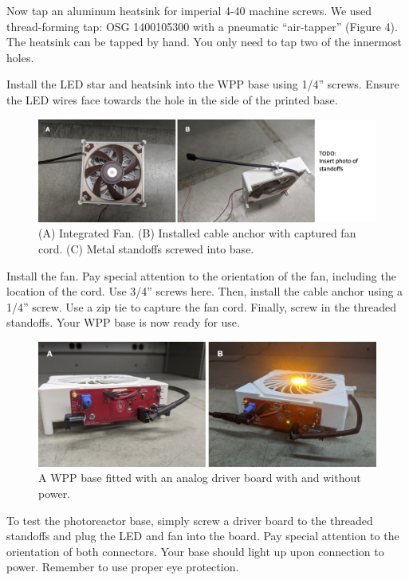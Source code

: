 \documentclass[11pt]{article}
\begin{document}
Now tap an aluminum heatsink for imperial 4-40 machine screws.
We used thread-forming tap: OSG 1400105300 with a pneumatic ``air-tapper'' (Figure 4).
The heatsink can be tapped by hand.
You only need to tap two of the innermost holes.

Install the LED star and heatsink into the WPP base using 1/4'' screws.
Ensure the LED wires face towards the hole in the side of the printed base.  

\begin{figure}[H]
	\includegraphics[width=\textwidth]{"./fig6.png"}
	\caption{(A) Integrated Fan. (B) Installed cable anchor with captured fan cord. (C) Metal standoffs screwed into base.}
\end{figure}

Install the fan.
Pay special attention to the orientation of the fan, including the location of the cord.
Use 3/4'' screws here.
Then, install the cable anchor using a 1/4'' screw.
Use a zip tie to capture the fan cord.
Finally, screw in the threaded standoffs. 
Your WPP base is now ready for use.

\begin{figure}[H]
	\includegraphics[width=\textwidth]{"./fig7.png"}
	\caption{A WPP base fitted with an analog driver board with and without power.}
\end{figure}

To test the photoreactor base, simply screw a driver board to the threaded standoffs and plug the LED and fan into the board.
Pay special attention to the orientation of both connectors.
Your base should light up upon connection to power.
Remember to use proper eye protection.
\end{document}
